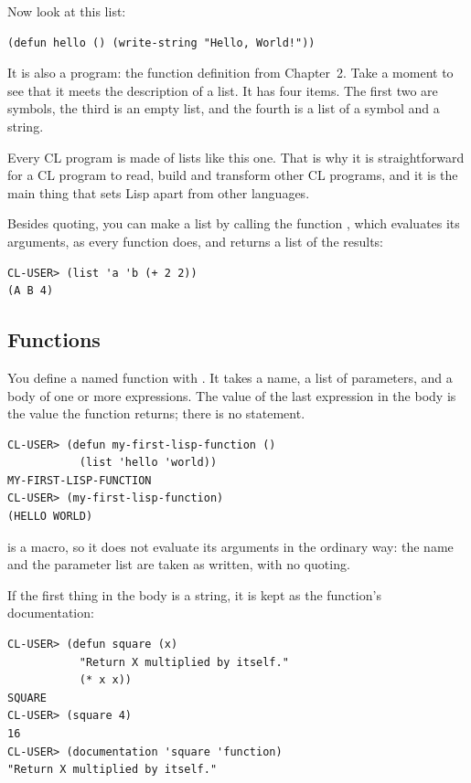 Now look at this list:

\begin{verbatim}
(defun hello () (write-string "Hello, World!"))
\end{verbatim}

It is also a program: the function definition from Chapter~2. Take a
moment to see that it meets the description of a list. It has four
items. The first two are symbols, the third is an empty list, and the
fourth is a list of a symbol and a string.

Every CL program is made of lists like this one. That is why it is
straightforward for a CL program to read, build and transform other CL
programs, and it is the main thing that sets Lisp apart from other
languages.

Besides quoting, you can make a list by calling the function
, which evaluates its arguments, as every function does, and
returns a list of the results:

\begin{verbatim}
CL-USER> (list 'a 'b (+ 2 2))
(A B 4)
\end{verbatim}

\subsection{Functions}

You define a named function with . It takes a name, a list
of parameters, and a body of one or more expressions. The value of
the last expression in the body is the value the function returns;
there is no  statement.

\begin{verbatim}
CL-USER> (defun my-first-lisp-function ()
           (list 'hello 'world))
MY-FIRST-LISP-FUNCTION
CL-USER> (my-first-lisp-function)
(HELLO WORLD)
\end{verbatim}

 is a macro, so it does not evaluate its arguments in the
ordinary way: the name and the parameter list are taken as written,
with no quoting.

If the first thing in the body is a string, it is kept as the
function's documentation:

\begin{verbatim}
CL-USER> (defun square (x)
           "Return X multiplied by itself."
           (* x x))
SQUARE
CL-USER> (square 4)
16
CL-USER> (documentation 'square 'function)
"Return X multiplied by itself."
\end{verbatim}

